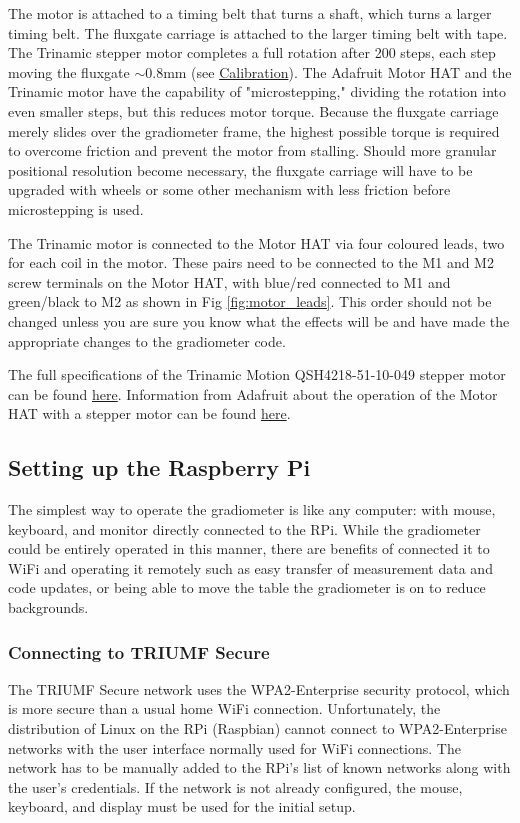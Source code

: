 \documentclass{TheMartianReport}
\begin{document}
The motor is attached to a timing belt that turns a shaft, which turns a larger timing belt. The fluxgate carriage is attached to the larger timing belt with tape. The Trinamic stepper motor completes a full rotation after 200 steps, each step moving the fluxgate $\sim$0.8mm (see \hyperref[subsec:Calibration]{Calibration}). The Adafruit Motor HAT and the Trinamic motor have the capability of "microstepping," dividing the rotation into even smaller steps, but this reduces motor torque. Because the fluxgate carriage merely slides over the gradiometer frame, the highest possible torque is required to overcome friction and prevent the motor from stalling. Should more granular positional resolution become necessary, the fluxgate carriage will have to be upgraded with wheels or some other mechanism with less friction before microstepping is used.

The Trinamic motor is connected to the Motor HAT via four coloured leads, two for each coil in the motor. These pairs need to be connected to the M1 and M2 screw terminals on the Motor HAT, with blue/red connected to M1 and green/black to M2 as shown in Fig \ref{fig:motor_leads}. This order should not be changed unless you are sure you know what the effects will be and have made the appropriate changes to the gradiometer code.

The full specifications of the Trinamic Motion QSH4218-51-10-049 stepper motor can be found \href{https://www.trinamic.com/fileadmin/assets/Products/Motors_Documents/QSH4218_manual.pdf}{here}. Information from Adafruit about the operation of the Motor HAT with a stepper motor can be found \href{https://learn.adafruit.com/adafruit-dc-and-stepper-motor-hat-for-raspberry-pi/using-stepper-motors}{here}.

\subsection{Setting up the Raspberry Pi} \label{subsec:Rpi Setup}
The simplest way to operate the gradiometer is like any computer: with mouse, keyboard, and monitor directly connected to the RPi. While the gradiometer could be entirely operated in this manner, there are benefits of connected it to WiFi and operating it remotely such as easy transfer of measurement data and code updates, or being able to move the table the gradiometer is on to reduce backgrounds.

\subsubsection{Connecting to TRIUMF Secure}
The TRIUMF Secure network uses the WPA2-Enterprise security protocol, which is more secure than a usual home WiFi connection. Unfortunately, the distribution of Linux on the RPi (Raspbian) cannot connect to WPA2-Enterprise networks with the user interface normally used for WiFi connections. The network has to be manually added to the RPi's list of known networks along with the user's credentials. If the network is not already configured, the mouse, keyboard, and display must be used for the initial setup.
\end{document}
